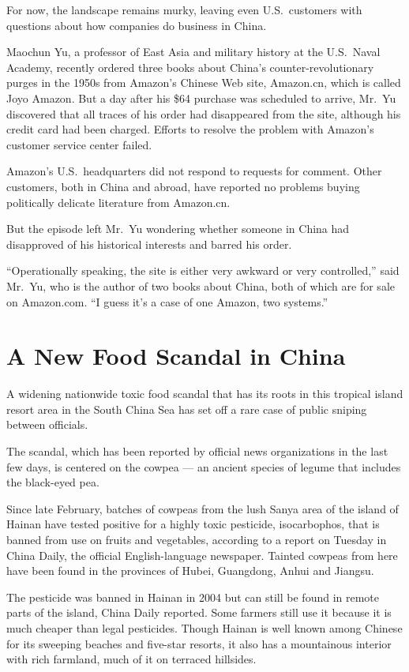 ﻿\documentclass[12pt]{article}
\begin{document}
For now, the landscape remains murky, leaving even U.S.~customers with questions about how companies
do business in China.

Maochun Yu, a professor of East Asia and military history at the U.S.~Naval Academy, recently
ordered three books about China's counter-revolutionary purges in the 1950s from Amazon's Chinese
Web site, Amazon.cn, which is called Joyo Amazon. But a day after his \$64 purchase was scheduled to
arrive, Mr.~Yu discovered that all traces of his order had disappeared from the site, although his
credit card had been charged. Efforts to resolve the problem with Amazon's customer service center
failed.

Amazon's U.S.~headquarters did not respond to requests for comment. Other customers, both in China
and abroad, have reported no problems buying politically delicate literature from Amazon.cn.

But the episode left Mr.~Yu wondering whether someone in China had disapproved of his historical
interests and barred his order.

``Operationally speaking, the site is either very awkward or very controlled,'' said Mr.~Yu, who is
the author of two books about China, both of which are for sale on Amazon.com. ``I guess it's a case
of one Amazon, two systems.''

\section{A New Food Scandal in China}

\lettrine{A}{} widening nationwide toxic food scandal that has its roots in
this tropical island resort area in the South China Sea has set off a rare case of public sniping
between officials.

The scandal, which has been reported by official news organizations in the last few days, is
centered on the cowpea — an ancient species of legume that includes the black-eyed pea.

Since late February, batches of cowpeas from the lush Sanya area of the island of Hainan have tested
positive for a highly toxic pesticide, isocarbophos, that is banned from use on fruits and
vegetables, according to a report on Tuesday in China Daily, the official English-language
newspaper. Tainted cowpeas from here have been found in the provinces of Hubei, Guangdong, Anhui and
Jiangsu.

The pesticide was banned in Hainan in 2004 but can still be found in remote parts of the island,
China Daily reported. Some farmers still use it because it is much cheaper than legal pesticides.
Though Hainan is well known among Chinese for its sweeping beaches and five-star resorts, it also
has a mountainous interior with rich farmland, much of it on terraced hillsides.
\end{document}

